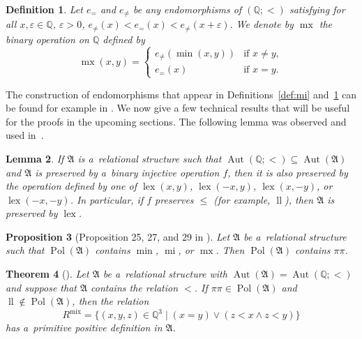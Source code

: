\documentclass[preprint,12pt]{elsarticle}
\newcommand{\Q}{\mathbb Q}
\newcommand{\bA}{{\mathfrak A}}
\newcommand{\checked}[1]{#1}
\DeclareMathOperator{\Aut}{Aut}
\DeclareMathOperator{\Pol}{Pol}
\DeclareMathOperator{\mi}{mi}
\DeclareMathOperator{\lele}{ll}
\DeclareMathOperator{\mx}{mx}
\DeclareMathOperator{\lex}{lex}
\DeclareMathOperator{\mix}{mix}
\newtheorem{theorem}{Theorem}
\newtheorem{lemma}[theorem]{Lemma}
\newtheorem{proposition}[theorem]{Proposition}
\newtheorem{definition}[theorem]{Definition}
\begin{document}
\begin{definition}\label{def:mx}
Let $e_=$ and $e_{\neq}$ be any endomorphisms
of $(\Q;<)$ satisfying
for all $x, \varepsilon \in \Q$, $\varepsilon > 0$, 
$e_{\neq}(x) < e_= (x) < e_{\neq}(x+\varepsilon).$
We denote by $\mx$  the binary operation on $\Q$ defined by
\[\mx(x,y) = \begin{cases}
      e_{\neq}(\min(x,y)) &\text{if } x \neq y, \\
      e_=(x) &\text{if } x = y.
\end{cases}
\]
\end{definition}

The construction of endomorphisms that appear in Definitions~\ref{def:mi} and~\ref{def:mx} can be found for example in \cite[Section 12.5]{Book}. \checked{We now give a few technical results that will be useful for the proofs in the upcoming sections.} The following \checked{lemma} was observed and used in~\cite{tcsps-journal}.

\begin{lemma}
\label{lem:lex}
If $\bA$ is a~relational structure 
such that $\Aut(\Q;<)\subseteq\Aut(\bA)$ 
and $\bA$ is preserved by a~binary injective operation $f$, then it is also preserved by the operation defined by one of $\lex(x,y)$, $\lex(-x,y)$, $\lex(x,-y)$, or $\lex(-x,-y)$. In particular, 
if $f$ preserves $\leq$ (for example, $\lele$), then $\bA$ is preserved by $\lex$. 
\end{lemma}

\begin{proposition}[Proposition 25, 27, and 29 in \cite{tcsps-journal}]\label{prop:pp}
Let $\bA$ be a~relational structure such that $\Pol(\bA)$ contains $\min$, $\mi$, or $\mx$.
Then $\Pol(\bA)$ contains $\pi\pi$.
\end{proposition}


\begin{theorem}[{\cite[Theorem 5.1]{BodirskyGreinerRydval}}]\label{thm:BGR}
Let $\bA$ be a~relational structure
with $\Aut(\bA)=\Aut(\Q;<)$ and suppose that $\bA$ contains the relation $<$.
If $\pi\pi \in \Pol(\bA)$ and $\lele \notin \Pol(\bA)$, 
then the relation
\[R^{\mix} = \{(x,y,z) \in \Q^3 \mid (x=y) \vee (z<x \wedge z<y) \}\]
has a~primitive positive definition in $\bA$.
\end{theorem}
\end{document}
